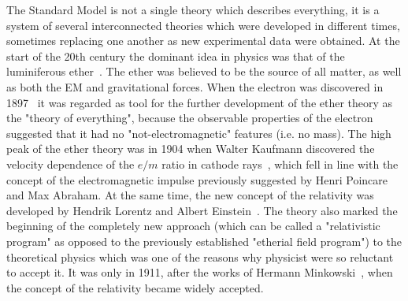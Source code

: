 The Standard Model is not a single theory which describes everything, it is a system of several interconnected theories which were developed in different times, sometimes replacing one another as new experimental data were obtained. At the start of the 20th century the dominant idea in physics was that of the luminiferous ether~\cite{lib:theory_EM1, lib:theory_EM2, lib:theory_EM3}. The ether was believed to be the source of all matter, as well as both the EM and gravitational forces. When the electron was discovered in 1897~\cite{lib:theory_electron} it was regarded as tool for the further development of the ether theory as the "theory of everything", because the observable properties of the electron suggested that it had no "not-electromagnetic" features (i.e. no mass). The high peak of the ether theory was in 1904 when Walter Kaufmann discovered the velocity dependence of the $e/m$ ratio in cathode rays~\cite{lib:theory_e_m1, lib:theory_e_m2}, which fell in line with the concept of the electromagnetic impulse previously suggested by Henri Poincare and Max Abraham. At the same time, the new concept of the relativity was developed by Hendrik Lorentz and Albert Einstein~\cite{lib:theory_relat}. The theory also marked the beginning of the completely new approach (which can be called a "relativistic program" as opposed to the previously established "etherial field program") to the theoretical physics which was one of the reasons why physicist were so reluctant to accept it. It was only in 1911, after the works of Hermann Minkowski~\cite{lib:theory_minkowski1, lib:theory_minkowski2}, when the concept of the relativity became widely accepted.

